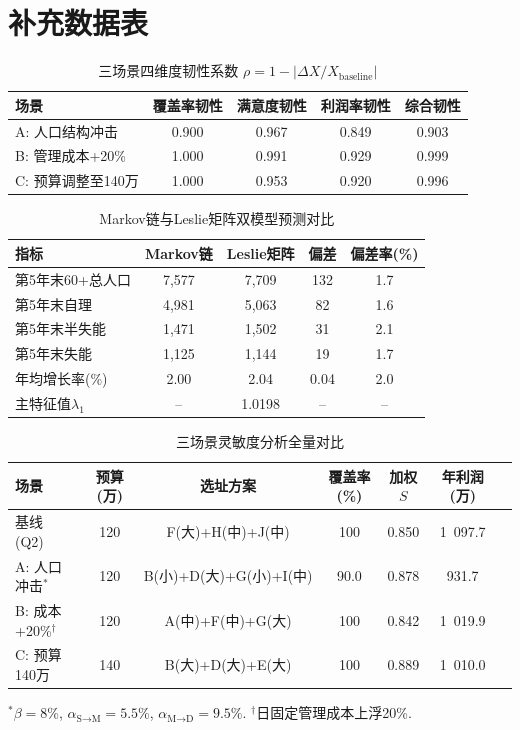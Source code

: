 \section{补充数据表}

\begin{table}[H]
\centering
\caption{三场景四维度韧性系数 $\rho = 1 - |\Delta X / X_{\text{baseline}}|$}
\label{tab:q4_resilience}
\begin{tabular}{lcccc}
\toprule
\textbf{场景} & \textbf{覆盖率韧性} & \textbf{满意度韧性} & \textbf{利润率韧性} & \textbf{综合韧性} \\
\midrule
A: 人口结构冲击 & 0.900 & 0.967 & 0.849 & 0.903 \\
B: 管理成本+20\% & 1.000 & 0.991 & 0.929 & 0.999 \\
C: 预算调整至140万 & 1.000 & 0.953 & 0.920 & 0.996 \\
\bottomrule
\end{tabular}
\end{table}

\begin{table}[H]
\centering
\caption{Markov链与Leslie矩阵双模型预测对比}
\label{tab:leslie_check}
\begin{tabular}{lcccc}
\hline
\textbf{指标} & \textbf{Markov链} & \textbf{Leslie矩阵} & \textbf{偏差} & \textbf{偏差率(\%)} \\
\hline
第5年末60+总人口 & 7,577 & 7,709 & 132 & 1.7 \\
第5年末自理 & 4,981 & 5,063 & 82 & 1.6 \\
第5年末半失能 & 1,471 & 1,502 & 31 & 2.1 \\
第5年末失能 & 1,125 & 1,144 & 19 & 1.7 \\
年均增长率(\%) & 2.00 & 2.04 & 0.04 & 2.0 \\
主特征值$\lambda_1$ & -- & 1.0198 & -- & -- \\
\hline
\end{tabular}
\end{table}

\begin{table}[H]
\centering
\caption{三场景灵敏度分析全量对比}
\label{tab:sensitivity_full}
\footnotesize
\begin{tabular}{lcccccc}
\toprule
\textbf{场景} & \textbf{预算(万)} & \textbf{选址方案} & \textbf{覆盖率(\%)} & \textbf{加权$S$} & \textbf{年利润(万)} \\
\midrule
基线 (Q2) & 120 & F(大)+H(中)+J(中) & 100 & 0.850 & 1~097.7 \\
A: 人口冲击$^*$ & 120 & B(小)+D(大)+G(小)+I(中) & 90.0 & 0.878 & 931.7 \\
B: 成本+20\%$^\dagger$ & 120 & A(中)+F(中)+G(大) & 100 & 0.842 & 1~019.9 \\
C: 预算140万 & 140 & B(大)+D(大)+E(大) & 100 & 0.889 & 1~010.0 \\
\bottomrule
\end{tabular}

\vspace{4pt}
{\footnotesize $^*\beta=8\%$, $\alpha_{\text{S}\to\text{M}}=5.5\%$, $\alpha_{\text{M}\to\text{D}}=9.5\%$. $^\dagger$日固定管理成本上浮20\%.}
\end{table}
